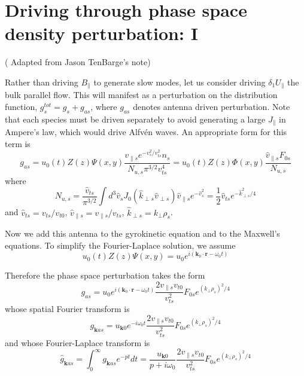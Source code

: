 \documentclass[12pt]{article}
\begin{document}
\section{Driving through phase space density perturbation: I}
( Adapted from Jason TenBarge's note)

Rather than driving $B_\parallel$ to generate slow modes, let us consider driving $\delta_1 U_\parallel$ the bulk parallel flow. This will manifest as a perturbation on the distribution function, $g^{tot}_s = g_s + g_{as}$, where $g_{as}$ denotes antenna driven perturbation. Note that each species must be driven separately to avoid generating a large $J_\parallel$ in Ampere's law, which would drive Alfv{\'e}n waves. An appropriate form for this term is
%
\begin{equation}
g_{as} =u_0(t)Z(z)\Psi(x, y) \frac{v_{\parallel s} e^{-v_s^2/v_{ts}^2} n_s}{N_{u,s} \pi^{3/2} v_{ts}^4} = u_0(t) Z(z) \Phi(x, y) \frac{\hat{v}_{\parallel s} F_{0s}}{N_{u,s}}
\end{equation}
where 
%
\begin{equation}
N_{u,s} = \frac{\hat{v}_{ts}}{\pi^{3/2}} \int d^3 \hat{v}_s J_0\left( \hat{k}_{\perp s} \hat{v}_{\perp s}\right) \hat{v}_{\parallel s} e^{-\hat{v}_s^2}  = \frac{1}{2}\hat{v}_{ts} e^{-\hat{k}_{\perp s}^2 /4}
\end{equation}
and $\hat{v}_{ts} = v_{ts}/v_{t0}$, $\hat{v}_{\parallel s} = v_{\parallel s}/ v_{ts}$, $\hat{k}_{\perp s} = k_\perp \rho_s$.

Now we add this antenna to the gyrokinetic equation and to the Maxwell's equations. To simplify the Fourier-Laplace solution, we assume
%
\begin{equation}
u_0(t) Z(z)\Psi(x, y) = u_0 e^{i (\mathbf{k}_0 \cdot \mathbf{r}-\omega_0 t)}
\end{equation}

Therefore the phase space perturbation takes the form
\begin{equation}
g_{as} = u_0  e^{i (\mathbf{k}_0 \cdot \mathbf{r}-\omega_0 t)} \frac{2 v_{\parallel s} v_{t0}}{v_{ts}^2} F_{0s} e^{(k_\perp \rho_s)^2/4}
\end{equation}
whose spatial Fourier transform is
%
\begin{equation}
g_{\mathbf{k}as} = u_{\mathbf{k}0} e^{-i\omega_0 t}  \frac{2 v_{\parallel s} v_{t0}}{v_{ts}^2} F_{0s} e^{(k_\perp \rho_s)^2/4}
\label{eq:gkas_1}
\end{equation}
and whose Fourier-Laplace transform is
%
\begin{equation}
\hat{g}_{\mathbf{k}as} = \int_0^\infty g_{\mathbf{k}as} e^{-pt} dt = \frac{u_{\mathbf{k}0}}{p+i\omega_0} \frac{2 v_{\parallel s} v_{t0}}{v_{ts}^2} F_{0s} e^{(k_\perp \rho_s)^2/4}
\label{eq:gkas_1}
\end{equation}
\end{document}
